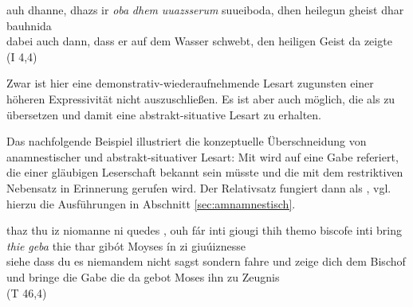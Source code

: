 %

\begin{exe}
\ex \label{ex:I2245}  auh dhanne, dhazs ir \textit{oba} \textit{dhem} \textit{uuazsserum} suueiboda, dhen heilegun gheist dhar bauhnida  \\
{dabei} {auch} {dann}, {dass} {er} {auf} {dem} {Wasser} {schwebt}, {den} {heiligen} {Geist} {da} {zeigte}\\
\glt {} (I 4,4)
\end{exe}

\noindent 
Zwar ist hier  eine demonstrativ-wiederaufnehmende Lesart zugunsten einer höheren Expressivität nicht auszuschließen. Es ist aber auch möglich, die  als  zu übersetzen und damit eine abstrakt-situative  Lesart zu erhalten. 



Das nachfolgende Beispiel illustriert die konzeptuelle Überschneidung von anamnestischer   und abstrakt-situativer  Lesart: Mit  wird auf eine Gabe referiert, die einer gläubigen Leserschaft bekannt sein müsste und die mit dem restriktiven Nebensatz in Erinnerung gerufen wird. Der Relativsatz fungiert dann als  \parencite[78--79]{Himmelmann1997}, vgl. hierzu die Ausführungen in Abschnitt \ref{sec:amnamnestisch}.\largerpage

%

\begin{exe}
\ex \label{ex:T9827}  {thaz} {thu} {iz} {niomanne} {ni} {quedes} {,} {ouh} {fár} {inti} {giougi} {thih} {themo} {biscofe} {inti} {bring} {\textit{thie}} {\textit{geba}} {thie} {thar} {gibót} {Moyses} {ín} {zi} {giuúiznesse} \\
{siehe} {dass} {du} {es} {niemandem} {nicht} {sagst} {} {sondern} {fahre} {und} {zeige} {dich} {dem} {Bischof} {und} {bringe} {die} {Gabe} {die} {da} {gebot} {Moses} {ihn} {zu} {Zeugnis} {}\\
\glt {} (T 46,4)
\end{exe}


